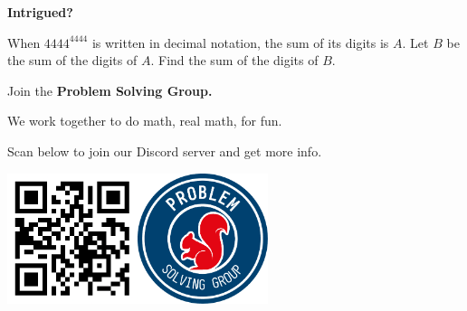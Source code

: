 \documentclass[20pt]{beamer}
\newcommand\clickbait[1]{{\Huge \bf #1}}
\newcommand\statement[1]{{\LARGE #1}}
\newcommand\join{
		Join the \textbf{Problem Solving Group.}

		We work together to do math, real math, for fun.

		Scan below to join our Discord server and get more info.

		\vspace{.3in}

		\includegraphics[width=1.5in]{qr}\hspace{1in}\includegraphics[width = 1.5in]{psg_logo}
	}
\begin{document}
\begin{frame}
	\begin{center}
		\clickbait{Intrigued?}

		\vfill

		\statement{When \(4444^{4444}\) is written in decimal notation, the sum of its digits is \(A\).
		Let \(B\) be the sum of the digits of \(A\). Find the sum of the digits of \(B\).  }

		\vfill

		\join
	\end{center}
\end{frame}
\end{document}
